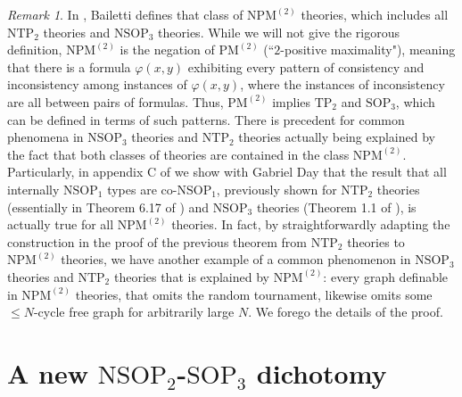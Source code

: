 \documentclass{amsart}
\theoremstyle{definition}
\theoremstyle{remark}
\newtheorem{remark}[theorem]{Remark}
\numberwithin{equation}{section}
\begin{document}
\begin{tcolorbox}
\begin{remark}
    
    In \cite{Bailetti25}, Bailetti defines that class of $\mathrm{NPM}^{(2)}$ theories, which includes all $\mathrm{NTP}_{2}$ theories and $\mathrm{NSOP}_{3}$ theories.  While we will not give the rigorous definition, $\mathrm{NPM}^{(2)}$ is the negation of $\mathrm{PM}^{(2)}$ (``$2$-positive maximality"), meaning that there is a formula $\varphi(x,y)$ exhibiting every pattern of consistency and inconsistency among instances of $\varphi(x,y)$, where the instances of inconsistency are all between pairs of formulas. Thus, $\mathrm{PM}^{(2)}$ implies $\mathrm{TP}_{2}$ and $\mathrm{SOP}_{3}$, which can be defined in terms of such patterns. There is precedent for common phenomena in $\mathrm{NSOP}_{3}$ theories and $\mathrm{NTP}_{2}$ theories actually being explained by the fact that both classes of theories are contained in the class $\mathrm{NPM}^{(2)}$. Particularly, in appendix C of \cite{Patterning} we show with Gabriel Day that the result that all internally $\mathrm{NSOP}_{1}$ types are co-$\mathrm{NSOP}_{1}$, previously shown for $\mathrm{NTP}_{2}$ theories (essentially in Theorem 6.17 of \cite{Che14}) and $\mathrm{NSOP}_{3}$ theories (Theorem 1.1 of \cite{INDNSOP3}), is actually true for all $\mathrm{NPM}^{(2)}$ theories. In fact, by straightforwardly adapting the construction in the proof of the previous theorem from $\mathrm{NTP}_{2}$ theories to $\mathrm{NPM}^{(2)}$ theories, we have another example of a common phenomenon in $\mathrm{NSOP}_{3}$ theories and $\mathrm{NTP}_{2}$ theories that is explained by $\mathrm{NPM}^{(2)}$: every graph definable in $\mathrm{NPM}^{(2)}$ theories, that omits the random tournament, likewise omits some $\leq N$-cycle free graph for arbitrarily large $N$. We forego the details of the proof.
\end{remark}
    




   
\end{tcolorbox}














\section{A new $\mathrm{NSOP}_{2}$-$\mathrm{SOP}_{3}$ dichotomy}\label{nsop2 vs nsop3}
\end{document}
